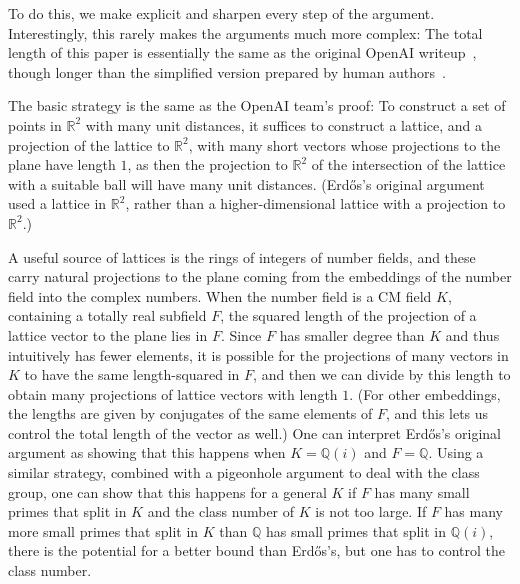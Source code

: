 \documentclass[12pt]{amsart}
\theoremstyle{remark}
\theoremstyle{definition}
\begin{document}
To do this, we make explicit and sharpen every step of the argument. Interestingly, this rarely makes the arguments much more complex: The total length of this paper is essentially the same as the original OpenAI writeup~\cite{machinewriteup}, though longer than the simplified version prepared by human authors~\cite{humanwriteup}.

The basic strategy is the same as the OpenAI team's proof: To construct a set of points in $\mathbb R^2$ with many unit distances, it suffices to construct a lattice, and a projection of the lattice to $\mathbb R^2$, with many short vectors whose projections to the plane have length $1$, as then the projection to $\mathbb R^2$ of the intersection of the lattice with a suitable ball will have many unit distances. (Erd\H{o}s's original argument used a lattice in $\mathbb R^2$, rather than a higher-dimensional lattice with a projection to $\mathbb R^2$.)

A useful source of lattices is the rings of integers of number fields, and these carry natural projections to the plane coming from the embeddings of the number field into the complex numbers. When the number field is a CM field $K$, containing a totally real subfield $F$, the squared length of the projection of a lattice vector to the plane lies in $F$. Since $F$ has smaller degree than $K$ and thus intuitively has fewer elements, it is possible for the projections of many vectors in $K$ to have the same length-squared in $F$, and then we can divide by this length to obtain many projections of lattice vectors with length $1$. (For other embeddings, the lengths are given by conjugates of the same elements of $F$, and this lets us control the total length of the vector as well.) One can interpret Erd\H{o}s's original argument as showing that this happens when $K= \mathbb Q(i)$ and $F=\mathbb Q$. Using a similar strategy, combined with a pigeonhole argument to deal with the class group, one can show that this happens for a general $K$ if $F$  has many small primes that split in $K$ and the class number of $K$ is not too large. If $F$ has many more small primes that split in $K$ than $\mathbb Q$ has small primes that split in $\mathbb Q(i)$, there is the potential for a better bound than Erd\H{o}s's, but one has to control the class number.
\end{document}
